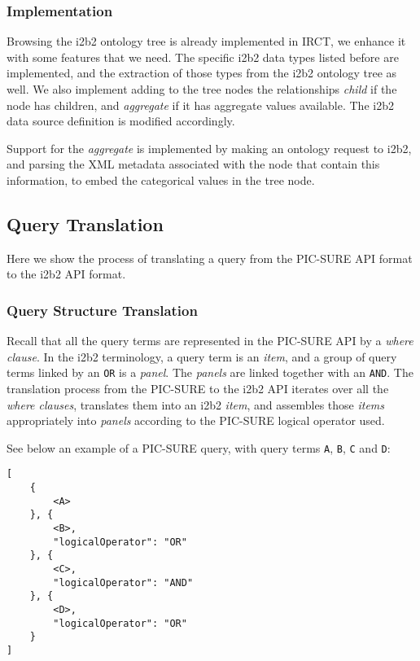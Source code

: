 
\subsubsection{Implementation}

Browsing the i2b2 ontology tree is already implemented in IRCT, we enhance it with some features that we need.
The specific i2b2 data types listed before are implemented, and the extraction of those types from the i2b2 ontology tree as well.
We also implement adding to the tree nodes the relationships \emph{child} if the node has children, and \emph{aggregate} if it has aggregate values available.
The i2b2 data source definition is modified accordingly.

Support for the \emph{aggregate} is implemented by making an ontology request to i2b2, and parsing the XML metadata associated with the node that contain this information, to embed the categorical values in the tree node.


\subsection{Query Translation}
\label{sec:interop-layer-query-translation}

Here we show the process of translating a query from the PIC-SURE API format to the i2b2 API format.

\subsubsection{Query Structure Translation}

Recall that all the query terms are represented in the PIC-SURE API by a \emph{where clause}.
In the i2b2 terminology, a query term is an \emph{item}, and a group of query terms linked by an \verb|OR| is a \emph{panel}.
The \emph{panels} are linked together with an \verb|AND|.
The translation process from the PIC-SURE to the i2b2 API iterates over all the \emph{where clauses}, translates them into an i2b2 \emph{item}, and assembles those \emph{items} appropriately into \emph{panels} according to the PIC-SURE logical operator used.

\begin{samepage}
See below an example of a PIC-SURE query, with query terms \verb|A|, \verb|B|, \verb|C| and \verb|D|:
\begin{verbatim}
[
    { 
        <A>
    }, {
        <B>,
        "logicalOperator": "OR"
    }, {
        <C>,
        "logicalOperator": "AND"
    }, {
        <D>,
        "logicalOperator": "OR"
    }
]
\end{verbatim}
\end{samepage}

